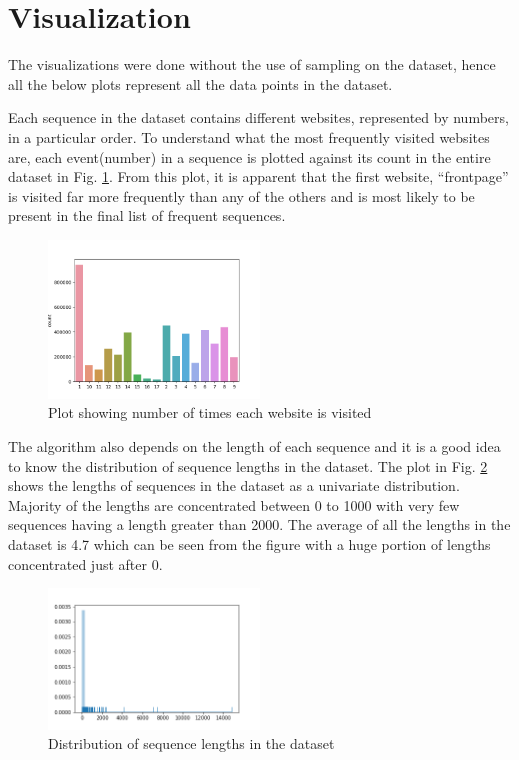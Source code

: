 \section{Visualization}

The visualizations were done without the use of sampling on the dataset, hence all the below plots represent all the data points in the dataset.

Each sequence in the dataset contains different websites, represented by numbers, in a particular order. To understand what the most frequently visited websites are, each event(number) in a sequence is plotted against its count in the entire dataset in Fig. \ref{website_histogram}. From this plot, it is apparent that the first website, ``frontpage'' is visited far more frequently than any of the others and is most likely to be present in the final list of frequent sequences.

\begin{figure}[h]
    \centerline{\includegraphics[width=0.5\textwidth]{figures/histogram_categories.png}}
    \caption{Plot showing number of times each website is visited}
    \label{website_histogram}
\end{figure}

The algorithm also depends on the length of each sequence and it is a good idea to know the distribution of sequence lengths in the dataset. The plot in Fig. \ref{distribution_lengths} shows the lengths of sequences in the dataset as a univariate distribution. Majority of the lengths are concentrated between 0 to 1000 with very few sequences having a length greater than 2000. The average of all the lengths in the dataset is 4.7 which can be seen from the figure with a huge portion of lengths concentrated just after 0.

\begin{figure}[h]
    \centerline{\includegraphics[width=0.5\textwidth]{figures/distribution_lengths.png}}
    \caption{Distribution of sequence lengths in the dataset}
    \label{distribution_lengths}
\end{figure}
